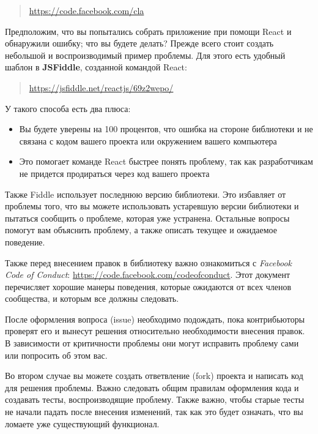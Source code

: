 \begin{quotation}
	\href{https://code.facebook.com/cla}{https://code.facebook.com/cla}
\end{quotation}

Предположим, что вы попытались собрать приложение при помощи React и обнаружили ошибку; что вы будете делать? Прежде всего стоит создать небольшой и воспроизводимый пример проблемы. Для этого есть удобный шаблон в \textbf{JSFiddle}, созданной командой React:

\begin{quotation}
	\href{https://jsfiddle.net/reactjs/69z2wepo/}{https://jsfiddle.net/reactjs/69z2wepo/}
\end{quotation}

У такого способа есть два плюса:

\begin{itemize}
  \item Вы будете уверены на 100 процентов, что ошибка на стороне библиотеки и не связана с кодом вашего проекта или окружением вашего компьютера
  \item Это помогает команде React быстрее понять проблему, так как разработчикам не придется продираться через код вашего проекта
\end{itemize}

Также Fiddle использует последнюю версию библиотеки. Это избавляет от проблемы того, что вы можете использовать устаревшую версии библиотеки и пытаться сообщить о проблеме, которая уже устранена. Остальные вопросы помогут вам объяснить проблему, а также описать текущее и ожидаемое поведение.

Также перед внесением правок в библиотеку важно ознакомиться с \textit{Facebook Code of Conduct}: \href{https://code.facebook.com/codeofconduct}{https://code.facebook.com/codeofconduct}. Этот документ перечисляет хорошие манеры поведения, которые ожидаются от всех членов сообщества, и которым все должны следовать.

После оформления вопроса (issue) необходимо подождать, пока контрибьюторы проверят его и вынесут решения относительно необходимости внесения правок. В зависимости от критичности проблемы они могут исправить проблему сами или попросить об этом вас.

Во втором случае вы можете создать ответвление (fork) проекта и написать код для решения проблемы. Важно следовать общим правилам оформления кода и создавать тесты, воспроизводящие проблему. Также важно, чтобы старые тесты не начали падать после внесения изменений, так как это будет означать, что вы ломаете уже существующий функционал. 

